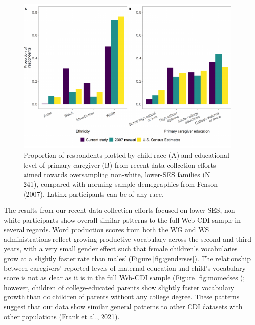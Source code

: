 \documentclass[
  english,
  ,man,floatsintext]{apa6}
\begin{document}
\begin{figure}
\centering
\includegraphics{webcdi_paper_files/figure-latex/demobarses-1.pdf}
\caption{\label{fig:demobarses}Proportion of respondents plotted by child race (A) and educational level of primary caregiver (B) from recent data collection efforts aimed towards oversampling non-white, lower-SES families (N = 241), compared with norming sample demographics from Fenson (2007). Latinx participants can be of any race.}
\end{figure}

The results from our recent data collection efforts focused on lower-SES, non-white participants show overall similar patterns to the full Web-CDI sample in several regards. Word production scores from both the WG and WS administrations reflect growing productive vocabulary across the second and third years, with a very small gender effect such that female children's vocabularies grow at a slightly faster rate than males' (Figure \ref{fig:genderses}). The relationship between caregivers' reported levels of maternal education and child's vocabulary score is not as clear as it is in the full Web-CDI sample (Figure \ref{fig:momedses}); however, children of college-educated parents show slightly faster vocabulary growth than do children of parents without any college degree. These patterns suggest that our data show similar general patterns to other CDI datasets with other populations (Frank et al., 2021).
\end{document}
